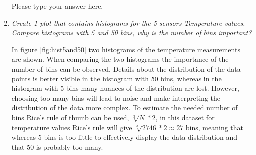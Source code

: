 \documentclass[a4paper,12pt]{article} %
\begin{document}
\begin{enumerate}
Please type your answer here.

\item {\it Create 1 plot that contains histograms for the 5 sensors Temperature values. Compare histograms with 5 and 50 bins, why is the number of bins important?}

In figure \ref{fig:hist5and50} two histograms of the temperature measurements are shown. When comparing the two histograms the importance of the number of bins can be observed. Details about the distribution of the data points is better visible in the histogram with 50 bins, whereas in the histogram with 5 bins many nuances of the distribution are lost. However, choosing too many bins will lead to noise and make interpreting the distribution of the data more complex. To estimate the needed number of bins Rice's rule of thumb can be used, $\sqrt[3]{{N}} * 2 $, in this dataset for temperature values Rice's rule will give $\sqrt[3]{{2746}} * 2 \approx 27 $ bins, meaning that whereas 5 bins is too little to effectively display the data distribution and that 50 is probably too many.


\end{enumerate}
\end{document}
